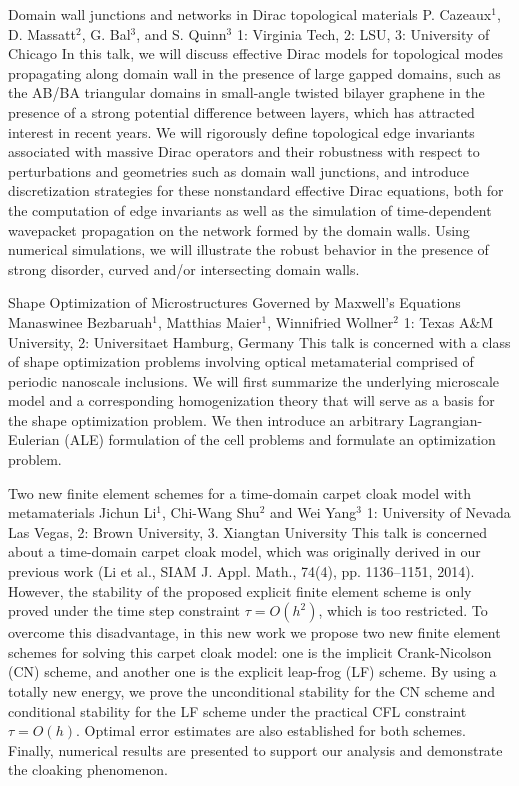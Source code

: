 \begin{addmargin}[2em]{0em}
\vspace{1.5ex}
\abs
{Domain wall junctions and networks in Dirac topological materials}
{P. Cazeaux$^{1}$, D. Massatt$^{2}$, G. Bal$^3$, and S. Quinn$^3$}
{1: Virginia Tech, 2: LSU, 3: University of Chicago}
{In this talk, we will discuss effective Dirac models for topological modes propagating along domain wall in the presence of large gapped domains, such as the AB/BA triangular domains in small-angle twisted bilayer graphene in the presence of a strong potential difference between layers, which has attracted interest in recent years. We will rigorously define topological edge invariants associated with massive Dirac operators and their robustness with respect to perturbations and geometries such as domain wall junctions, and introduce discretization strategies for these nonstandard effective Dirac equations, both for the computation of edge invariants as well as the simulation of time-dependent wavepacket propagation on the network formed by the domain walls. Using numerical simulations, we will illustrate the robust behavior in the presence of strong disorder, curved and/or intersecting domain walls.}


\vspace{1.5ex}
\abs
{Shape Optimization of Microstructures Governed by Maxwell's Equations}
{Manaswinee Bezbaruah$^{1}$, Matthias Maier$^{1}$, Winnifried Wollner$^{2}$}
{1: Texas A\&M University, 2: Universitaet Hamburg, Germany}
{This talk is concerned with a class of shape optimization problems involving optical metamaterial comprised of periodic nanoscale inclusions. We will first summarize the underlying microscale model and a corresponding homogenization theory that will serve as a basis for the shape optimization problem. We then introduce an arbitrary Lagrangian-Eulerian (ALE) formulation of the cell problems and formulate an optimization problem.}


\vspace{1.5ex}
\abs
{Two new finite element schemes for a time-domain carpet cloak model with metamaterials}
{Jichun Li$^{1}$, Chi-Wang Shu$^{2}$ and Wei Yang$^{3}$}
{1: University of Nevada Las Vegas, 2: Brown University, 3. Xiangtan University}
{This talk is concerned about a time-domain carpet cloak model, which was originally derived in our previous work (Li et al., SIAM J. Appl. Math., 74(4), pp. 1136–1151, 2014). However, the stability of the proposed explicit finite element scheme is only proved under the time step constraint $\tau = O(h^2)$, which is too restricted.  To overcome this disadvantage, in this new work we propose two new finite element schemes for solving this carpet cloak model: one is the implicit Crank-Nicolson (CN) scheme, and another one is the explicit leap-frog (LF) scheme. By using a totally new energy, we prove the unconditional stability for the CN scheme and  conditional stability for the LF scheme under the practical CFL constraint $\tau = O(h)$.   Optimal error estimates are also established for both schemes. Finally, numerical results  are presented to support our analysis and demonstrate the cloaking phenomenon.}



\end{addmargin}

